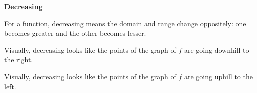 \documentclass{ximera}
\begin{document}
\begin{idea} \textbf{\textcolor{blue!55!black}{Decreasing}}

For a function, decreasing means the domain and range change oppositely: one becomes greater and the other becomes lesser.
\end{idea}


\begin{observation}
Visually, decreasing looks like the points of the graph of $f$ are going downhill to the right.
\end{observation}

\begin{observation}
Visually, decreasing looks like the points of the graph of $f$ are going uphill to the left.
\end{observation}
\end{document}
